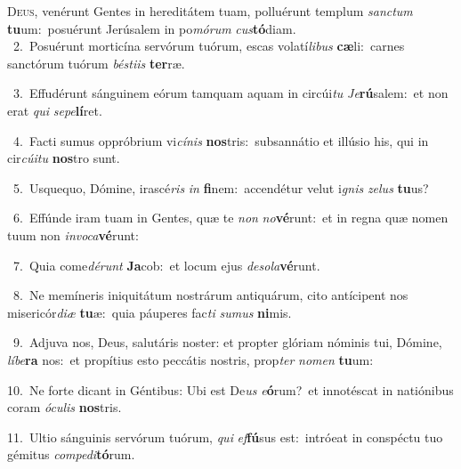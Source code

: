 \lettrine{\initial\textcolor{\initialcolor}{D}}{eus,} venérunt Gentes in hereditátem tuam, polluérunt templum \textit{sanc}\-\textit{tum} \textbf{tu}\-um:~\star posuérunt Jerúsalem in po\-\textit{mó}\-\textit{rum} \textit{cus}\-\textbf{tó}diam.\\
{\numbfont\textcolor{\numbcolor}{~2.}}~Posuérunt morticína servórum tuórum, escas volatí\-\textit{li}\-\textit{bus} \textbf{cæ}\-li:~\star carnes sanctórum tuórum \textit{bés}\-\textit{ti}\textit{is} \textbf{ter}\-ræ.\par
{\numbfont\textcolor{\numbcolor}{~3.}}~Effudérunt sánguinem eórum tamquam aquam in circúi\textit{tu} \textit{Je}\-\textbf{rú}salem:~\star et non erat \textit{qui} \textit{se}\-\textit{pe}\textbf{lí}ret.\par
{\numbfont\textcolor{\numbcolor}{~4.}}~Facti sumus oppróbrium vi\-\textit{cí}\-\textit{nis} \textbf{nos}\-tris:~\star subsannátio et illúsio his, qui in cir\-\textit{cú}\-\textit{i}\textit{tu} \textbf{nos}\-tro sunt.\par
{\numbfont\textcolor{\numbcolor}{~5.}}~Usquequo, Dómine, irascé\textit{ris} \textit{in} \textbf{fi}\-nem:~\star accendétur velut i\textit{gnis} \textit{ze}\-\textit{lus} \textbf{tu}\-us?\par
{\numbfont\textcolor{\numbcolor}{~6.}}~Effúnde iram tuam in Gentes, quæ te \textit{non} \textit{no}\-\textbf{vé}runt:~\star et in regna quæ nomen tuum non \textit{in}\-\textit{vo}\textit{ca}\textbf{vé}runt:\par
{\numbfont\textcolor{\numbcolor}{~7.}}~Quia come\-\textit{dé}\-\textit{runt} \textbf{Ja}\-cob:~\star et locum ejus \textit{de}\-\textit{so}\textit{la}\textbf{vé}runt.\par
{\numbfont\textcolor{\numbcolor}{~8.}}~Ne memíneris iniquitátum nostrárum antiquárum, cito antícipent nos misericór\-\textit{di}\-\textit{æ} \textbf{tu}\-æ:~\star quia páuperes fac\textit{ti} \textit{su}\-\textit{mus} \textbf{ni}\-mis.\par
{\numbfont\textcolor{\numbcolor}{~9.}}~Adjuva nos, Deus, salutáris noster: et propter glóriam nóminis tui, Dómine, \textit{lí}\-\textit{be}\textbf{ra} nos:~\star et propítius esto peccátis nostris, prop\textit{ter} \textit{no}\-\textit{men} \textbf{tu}\-um:\par
{\numbfont\textcolor{\numbcolor}{10.}}~Ne forte dicant in Géntibus: Ubi est De\textit{us} \textit{e}\-\textbf{ó}rum?~\star et innotéscat in natiónibus coram \textit{ó}\-\textit{cu}\textit{lis} \textbf{nos}\-tris.\par
{\numbfont\textcolor{\numbcolor}{11.}}~Ultio sánguinis servórum tuórum, \textit{qui} \textit{ef}\-\textbf{fú}sus est:~\star intróeat in conspéctu tuo gémitus \textit{com}\-\textit{pe}\textit{di}\textbf{tó}rum.\par

